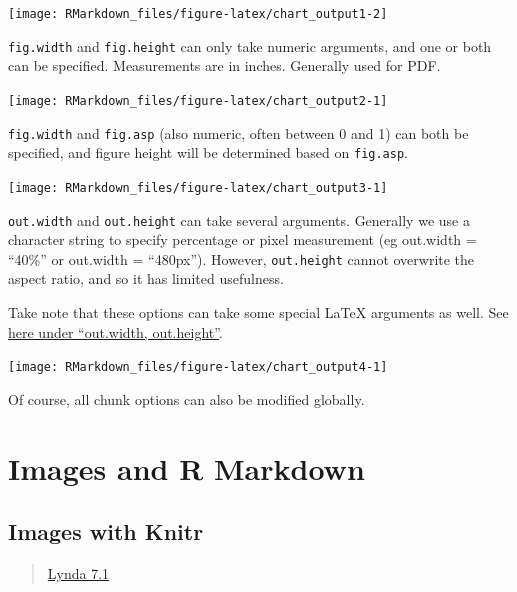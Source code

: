 \documentclass[]{article}
\begin{document}
\begin{center}\texttt{[image: RMarkdown\_files/figure-latex/chart\_output1-2]} \end{center}

\texttt{fig.width} and \texttt{fig.height} can only take numeric
arguments, and one or both can be specified. Measurements are in inches.
Generally used for PDF.

\begin{center}\texttt{[image: RMarkdown\_files/figure-latex/chart\_output2-1]} \end{center}

\texttt{fig.width} and \texttt{fig.asp} (also numeric, often between 0
and 1) can both be specified, and figure height will be determined based
on \texttt{fig.asp}.

\begin{center}\texttt{[image: RMarkdown\_files/figure-latex/chart\_output3-1]} \end{center}

\texttt{out.width} and \texttt{out.height} can take several arguments.
Generally we use a character string to specify percentage or pixel
measurement (eg out.width = ``40\%'' or out.width = ``480px''). However,
\texttt{out.height} cannot overwrite the aspect ratio, and so it has
limited usefulness.

Take note that these options can take some special LaTeX arguments as
well. See \href{https://yihui.name/knitr/options/\#plots}{here under
``out.width, out.height''}.

\begin{center}\texttt{[image: RMarkdown\_files/figure-latex/chart\_output4-1]} \end{center}

Of course, all chunk options can also be modified globally.

\hypertarget{images-and-r-markdown}{%
\section{Images and R Markdown}\label{images-and-r-markdown}}

\hypertarget{images-with-knitr}{%
\subsection{Images with Knitr}\label{images-with-knitr}}

\begin{quote}
\href{https://www.lynda.com/RStudio-tutorials/Inserting-images-include_graphics/699348/2800215-4.html?srchtrk=index\%3a1\%0alinktypeid\%3a2\%0aq\%3ar+markdown\%0apage\%3a1\%0as\%3arelevance\%0asa\%3atrue\%0aproducttypeid\%3a2}{Lynda
7.1}
\end{quote}
\end{document}
